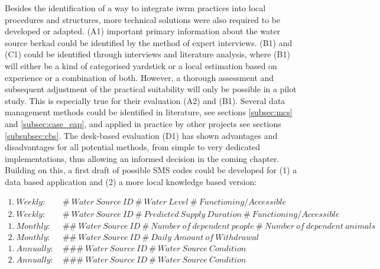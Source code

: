 Besides the identification of a way to integrate \acrshort{iwrm} practices into local procedures and structures, more technical solutions were also required to be developed or adapted. (A1) important primary information about the water source berkad could be identified by the method of expert interviews. (B1) and (C1) could be identified through interviews and literature analysis, where (B1) will either be a kind of categorised yardstick or a local estimation based on experience or a combination of both. However, a thorough assessment and subsequent adjustment of the practical suitability will only be possible in a pilot study. This is especially true for their evaluation (A2) and (B1). Several data management methods could be identified in literature, see sections \ref{subsec:mcs} and \ref{subsec:case_eap}, and applied in practice by other projects see sections \ref{subsubsec:cbs}. The desk-based evaluation (D1) has shown advantages and disadvantages for all potential methods, from simple to very dedicated implementations, thus allowing an informed decision in the coming chapter. Building on this, a first draft of possible SMS codes could be developed for (1) a data based application and (2) a more local knowledge based version:

\begin{center}
    \begin{minipage}{0.9\textwidth}
        \begin{align*}
            1.\: Weekly:\ &\#\: Water\: Source\: ID\: \#\: Water\: Level\: \#\: Functioning/Accessible\\
            2.\: Weekly:\ &\#\: Water\: Source\: ID\: \#\: Predicted\: Supply\: Duration\: \#\: Functioning/Accessible\\
            1.\: Monthly:\ &\#\#\: Water\: Source\: ID\: \#\: Number\: of\: dependent\: people\: \#\: Number\: of\: dependent\: animals\\
            2.\: Monthly:\ &\#\#\: Water\: Source\: ID\: \#\: Daily\: Amount\: of\: Withdrawal\\
            1.\: Annually:\ &\#\#\#\: Water\: Source\: ID\: \#\: Water\: Source\: Condition\\
            2.\: Annually:\ &\#\#\#\: Water\: Source\: ID\: \#\: Water\: Source\: Condition\\
        \end{align*}
    \end{minipage}
\end{center}

